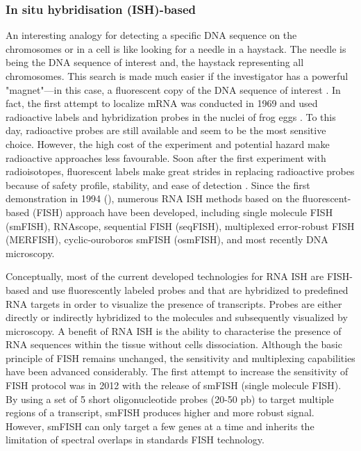 \subsubsection{In situ hybridisation (ISH)-based}
\label{section:Imaging_sequecing_review}
An interesting analogy for detecting a specific DNA sequence on the chromosomes or in a cell is like looking for a needle in a haystack. The needle is being the DNA sequence of interest and, the haystack representing all chromosomes. This search is made much easier if the investigator has a powerful "magnet"—in this case, a fluorescent copy of the DNA sequence of interest \cite{Connor2008natureEdu}. In fact, the first attempt to localize mRNA was conducted in 1969 and used radioactive labels and hybridization probes in the nuclei of frog eggs \cite{pardue1969molecular}. To this day, radioactive probes are still available and seem to be the most sensitive choice. However, the high cost of the experiment and potential hazard make radioactive approaches less favourable. Soon after the first experiment with radioisotopes, fluorescent labels make great strides in replacing radioactive probes because of safety profile, stability, and ease of detection \cite{rudkin1977high, Connor2008natureEdu}. Since the first demonstration in 1994 (\cite{bassell1994single}), numerous RNA ISH methods based on the fluorescent-based (FISH) approach have been developed, including single molecule FISH (smFISH), RNAscope, sequential FISH (seqFISH), multiplexed error-robust FISH (MERFISH), cyclic-ouroboros smFISH (osmFISH), and most recently DNA microscopy. 

Conceptually, most of the current developed technologies for RNA ISH are FISH-based and use fluorescently labeled probes and that are hybridized to predefined RNA targets in order to visualize the presence of transcripts. Probes are either directly or indirectly hybridized to the molecules and subsequently visualized by microscopy. A benefit of RNA ISH is the ability to characterise the presence of RNA sequences within the tissue without cells dissociation. Although the basic principle of FISH remains unchanged, the sensitivity and multiplexing capabilities have been advanced considerably. The first attempt to increase the sensitivity of FISH protocol was in 2012 with the release of smFISH (single molecule FISH). By using a set of 5 short oligonucleotide probes (20-50 pb) to target multiple regions of a transcript, smFISH produces higher and more robust signal. However, smFISH can only target a few genes at a time and inherits the limitation of spectral overlaps in standards FISH technology.

